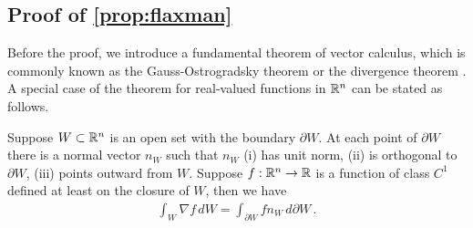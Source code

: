 
\subsection{Proof of \cref{prop:flaxman}}
Before the proof, we introduce a fundamental theorem of vector calculus, which is commonly known as the Gauss-Ostrogradsky theorem or the divergence theorem . A special case of the theorem for real-valued functions in $\mathbb{R}^n$ can be stated as follows.
\begin{lemma}
\label{lem:gradientCalculus}
Suppose $W \subset \mathbb{R}^n$ is an open set with the boundary $\partial W$. At each point of $\partial W$ there is a normal vector $n_W$ such that $n_W$  (i) has unit norm, (ii) is orthogonal to $\partial W$, (iii) points outward from $W$. Suppose $f: \mathbb{R}^n\to \mathbb{R}$ is a function of class $C^1$ defined at least on the closure of $W$, then we have
\begin{align*}
\int_{ W} \nabla f\,d W = \int_{\partial W} f n_W \,d \partial W \,.
\end{align*}
\end{lemma}


